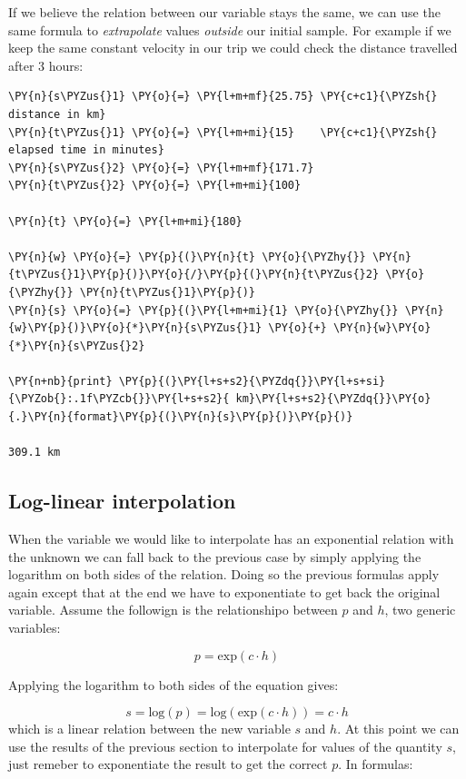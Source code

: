 If we believe the relation between our variable stays the same, we can use the same formula to \emph{extrapolate} values \emph{outside} our initial sample. For example if we keep the same constant velocity in our trip we could check the distance travelled after 3 hours:

\begin{tcolorbox}[breakable, size=fbox, boxrule=1pt, pad at break*=1mm,colback=cellbackground, colframe=cellborder]
\begin{Verbatim}[commandchars=\\\{\}]
\PY{n}{s\PYZus{}1} \PY{o}{=} \PY{l+m+mf}{25.75} \PY{c+c1}{\PYZsh{} distance in km}
\PY{n}{t\PYZus{}1} \PY{o}{=} \PY{l+m+mi}{15}    \PY{c+c1}{\PYZsh{} elapsed time in minutes}
\PY{n}{s\PYZus{}2} \PY{o}{=} \PY{l+m+mf}{171.7}
\PY{n}{t\PYZus{}2} \PY{o}{=} \PY{l+m+mi}{100}

\PY{n}{t} \PY{o}{=} \PY{l+m+mi}{180}

\PY{n}{w} \PY{o}{=} \PY{p}{(}\PY{n}{t} \PY{o}{\PYZhy{}} \PY{n}{t\PYZus{}1}\PY{p}{)}\PY{o}{/}\PY{p}{(}\PY{n}{t\PYZus{}2} \PY{o}{\PYZhy{}} \PY{n}{t\PYZus{}1}\PY{p}{)}
\PY{n}{s} \PY{o}{=} \PY{p}{(}\PY{l+m+mi}{1} \PY{o}{\PYZhy{}} \PY{n}{w}\PY{p}{)}\PY{o}{*}\PY{n}{s\PYZus{}1} \PY{o}{+} \PY{n}{w}\PY{o}{*}\PY{n}{s\PYZus{}2}

\PY{n+nb}{print} \PY{p}{(}\PY{l+s+s2}{\PYZdq{}}\PY{l+s+si}{\PYZob{}:.1f\PYZcb{}}\PY{l+s+s2}{ km}\PY{l+s+s2}{\PYZdq{}}\PY{o}{.}\PY{n}{format}\PY{p}{(}\PY{n}{s}\PY{p}{)}\PY{p}{)}

309.1 km
\end{Verbatim}
\end{tcolorbox}

\subsection{Log-linear interpolation}\label{log-linear-interpolation}
When the variable we would like to interpolate has an exponential relation with the unknown we can fall back to the previous case by simply applying the logarithm on both sides of the relation. Doing so the previous formulas apply again except that at the end we have to exponentiate to get back the original variable. Assume the followign is the relationshipo between $p$ and $h$, two generic variables:

\[p = \mathrm{exp}(c \cdot h)\]

Applying the logarithm to both sides of the equation gives:

\[s = \mathrm{log}(p) = \mathrm{log}(\mathrm{exp}(c \cdot h)) = c \cdot h\]
which is a linear relation between the new variable $s$ and $h$. At this point we can use the results of the previous section to interpolate for values of the quantity $s$, just remeber to exponentiate the result to get the correct $p$. In formulas:

